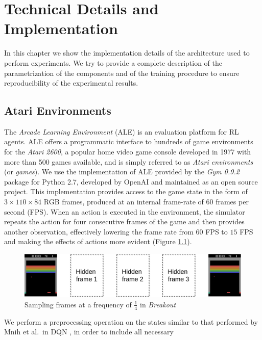 \chapter{Technical Details and Implementation}
\label{chapter5_technical_details}
\thispagestyle{empty}

\vspace{0.5cm}

In this chapter we show the implementation details of the architecture
used to perform experiments. We try to provide a complete description of the 
parametrization of the components and of the training procedure to ensure 
reproducibility of the experimental results.

\section{Atari Environments}
The \textit{Arcade Learning Environment} (ALE) \cite{bellemare2013arcade} is an 
evaluation platform for RL agents.
ALE offers a programmatic interface to hundreds of game environments for the 
\textit{Atari 2600}, a popular home video game console developed in 1977 with 
more than 500 games available, and is simply referred to as 
\textit{Atari environments} (or \textit{games}). 
We use the implementation of ALE provided by the \textit{Gym 0.9.2} package for 
Python 2.7, developed by OpenAI and maintained as an open source project. 
This implementation provides access to the game state in the form of 
$3 \times 110 \times 84$ RGB frames, produced at an internal frame-rate of $60$ 
frames per second (FPS).
When an action is executed in the environment, the simulator repeats the action 
for four consecutive frames of the game and then provides another observation, 
effectively lowering the frame rate from $60$ FPS to $15$ FPS and making the 
effects of actions more evident (Figure \ref{f:sampling}). 
%
\begin{figure}[h]
\includegraphics[width=\textwidth]{pictures/sampling}
\centering
\caption{Sampling frames at a frequency of $\frac{1}{4}$ in \textit{Breakout}}
\label{f:sampling}
\end{figure}
%
We perform a preprocessing operation on the states similar to that performed
by Mnih et al.\ in DQN \cite{mnih2015human}, in order to include all necessary 
